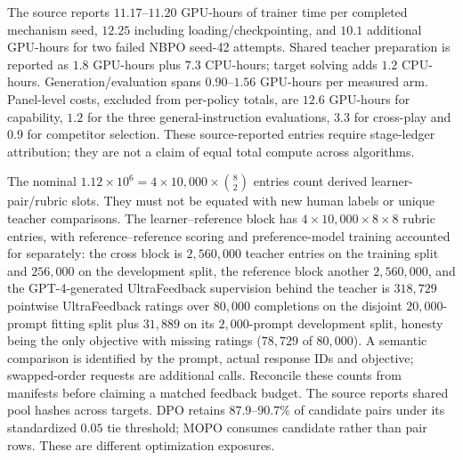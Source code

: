 \documentclass{article}
\theoremstyle{remark}
\theoremstyle{plain}
\begin{document}
The source reports $11.17$--$11.20$ GPU-hours of trainer time per completed mechanism seed, $12.25$ including loading/checkpointing, and $10.1$ additional GPU-hours for two failed NBPO seed-42 attempts. Shared teacher preparation is reported as $1.8$ GPU-hours plus $7.3$ CPU-hours; target solving adds $1.2$ CPU-hours. Generation/evaluation spans $0.90$--$1.56$ GPU-hours per measured arm. Panel-level costs, excluded from per-policy totals, are $12.6$ GPU-hours for capability, $1.2$ for the three general-instruction evaluations, $3.3$ for cross-play and $0.9$ for competitor selection. These source-reported entries require stage-ledger attribution; they are not a claim of equal total compute across algorithms.

The nominal $1.12\times10^6=4\times10{,}000\times\binom82$ entries count derived learner-pair/rubric slots. They must not be equated with new human labels or unique teacher comparisons. The learner--reference block has $4\times10{,}000\times8\times8$ rubric entries, with reference--reference scoring and preference-model training accounted for separately: the cross block is $2{,}560{,}000$ teacher entries on the training split and $256{,}000$ on the development split, the reference block another $2{,}560{,}000$, and the GPT-4-generated UltraFeedback supervision behind the teacher is $318{,}729$ pointwise UltraFeedback ratings over $80{,}000$ completions on the disjoint $20{,}000$-prompt fitting split plus $31{,}889$ on its $2{,}000$-prompt development split, honesty being the only objective with missing ratings ($78{,}729$ of $80{,}000$). A semantic comparison is identified by the prompt, actual response IDs and objective; swapped-order requests are additional calls. Reconcile these counts from manifests before claiming a matched feedback budget. The source reports shared pool hashes across targets. DPO retains $87.9$--$90.7\%$ of candidate pairs under its standardized $0.05$ tie threshold; MOPO consumes candidate rather than pair rows. These are different optimization exposures.
\end{document}
